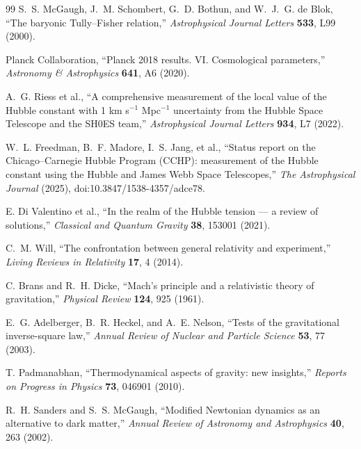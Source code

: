 \documentclass[11pt]{article}
\begin{document}
\begin{thebibliography}{99}
S.~S. McGaugh, J.~M. Schombert, G.~D. Bothun, and W.~J.~G. de Blok,
``The baryonic Tully--Fisher relation,''
\emph{Astrophysical Journal Letters} \textbf{533}, L99 (2000).

Planck Collaboration,
``Planck 2018 results. VI. Cosmological parameters,''
\emph{Astronomy \& Astrophysics} \textbf{641}, A6 (2020).

A.~G. Riess et al.,
``A comprehensive measurement of the local value of the Hubble constant with 1 km s$^{-1}$ Mpc$^{-1}$ uncertainty from the Hubble Space Telescope and the SH0ES team,''
\emph{Astrophysical Journal Letters} \textbf{934}, L7 (2022).

W.~L. Freedman, B.~F. Madore, I.~S. Jang, et al.,
``Status report on the Chicago--Carnegie Hubble Program (CCHP): measurement of the Hubble constant using the Hubble and James Webb Space Telescopes,''
\emph{The Astrophysical Journal} (2025), doi:10.3847/1538-4357/adce78.

E. Di Valentino et al.,
``In the realm of the Hubble tension --- a review of solutions,''
\emph{Classical and Quantum Gravity} \textbf{38}, 153001 (2021).

C.~M. Will,
``The confrontation between general relativity and experiment,''
\emph{Living Reviews in Relativity} \textbf{17}, 4 (2014).

C. Brans and R.~H. Dicke,
``Mach's principle and a relativistic theory of gravitation,''
\emph{Physical Review} \textbf{124}, 925 (1961).

E.~G. Adelberger, B.~R. Heckel, and A.~E. Nelson,
``Tests of the gravitational inverse-square law,''
\emph{Annual Review of Nuclear and Particle Science} \textbf{53}, 77 (2003).

T. Padmanabhan,
``Thermodynamical aspects of gravity: new insights,''
\emph{Reports on Progress in Physics} \textbf{73}, 046901 (2010).

R.~H. Sanders and S.~S. McGaugh,
``Modified Newtonian dynamics as an alternative to dark matter,''
\emph{Annual Review of Astronomy and Astrophysics} \textbf{40}, 263 (2002).


\end{thebibliography}
\end{document}
